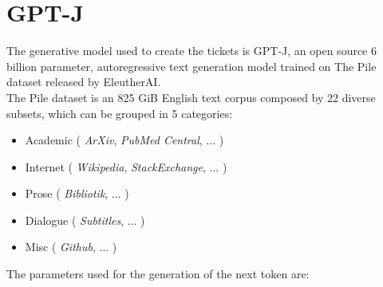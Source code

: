 \section{GPT-J}
The generative model used to create the tickets is GPT-J, an open source 6 billion parameter, autoregressive text generation model trained on The Pile dataset released by EleutherAI. \\
The Pile dataset\cite{gao2020pile} is an 825 GiB English text corpus composed by 22 diverse subsets, which can be grouped in 5 categories:
\begin{itemize}
    \item Academic ( \textit{ArXiv}, \textit{PubMed Central}, ... )
    \item Internet ( \textit{Wikipedia}, \textit{StackExchange}, ... )
    \item Prose ( \textit{Bibliotik}, ... )
    \item Dialogue ( \textit{Subtitles}, ... )
    \item Misc ( \textit{Github}, ... )
\end{itemize}
\vspace{0.5cm}
The parameters used for the generation of the next token are:
